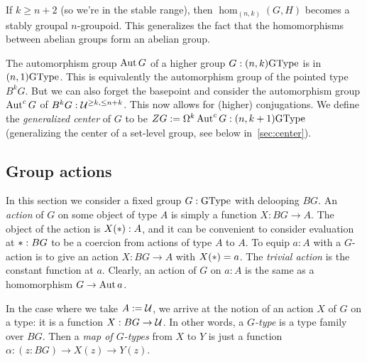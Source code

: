 If $k\ge n+2$ (so we're in the stable range), then $\hom_{(n,k)}(G,H)$
becomes a stably groupal $n$-groupoid. This generalizes the
fact that the homomorphisms between abelian groups form an abelian
group.

The automorphism group $\operatorname{Aut} G$ of a higher group $G:(n,k)\mathrm{GType}$ is in
$(n,1)\mathrm{GType}$.
This is equivalently the automorphism group of the pointed type $B^kG$.
But we can also forget the basepoint and consider the
automorphism group $\operatorname{Aut}^c G$ of $B^kG:\mathcal{U}^{\ge k,\le n+k}$. This
now allows for (higher) conjugations. We define the \emph{generalized
  center} of $G$ to be $ZG := \Omega^k\operatorname{Aut}^c G : (n,k+1)\mathrm{GType}$
(generalizing the center of a set-level group,
see below in~\autoref{sec:center}).

\subsection{Group actions}
\label{sec:actions}

In this section we consider a fixed group $G : \mathrm{GType}$ with delooping
$BG$. An \emph{action} of $G$ on some object of type $A$ is simply
a function $X : BG \to A$. The object of the action is $X(\ast) : A$,
and it can be convenient to consider evaluation at $\ast : BG$ to be a
coercion from actions of type $A$ to $A$. To equip $a : A$ with a
$G$-action is to give an action $X : BG \to A$ with $X(\ast)=a$. The
\emph{trivial action} is the constant function at $a$. Clearly, an
action of $G$ on $a:A$ is the same as a homomorphism $G \to \operatorname{Aut} a$.

In the case where we take $A:=\mathcal{U}$, we arrive at the notion of an action $X$ of $G$ on a type:
it is a function $X:BG\to\mathcal{U}$. 
In other words, a \emph{$G$-type} is a type family over $BG$.
Then a \emph{map of $G$-types} from $X$ to $Y$ is just a function $\alpha :
(z : BG) \to X(z) \to Y(z)$.

